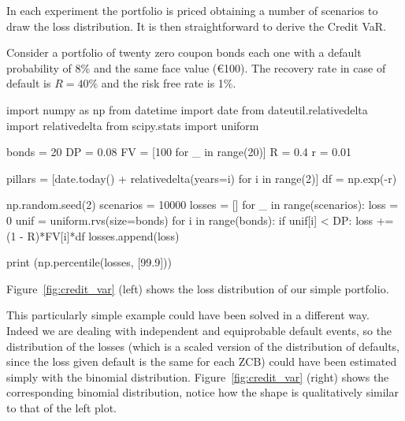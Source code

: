 In each experiment the portfolio is priced obtaining a number of scenarios to draw the loss distribution. It is then straightforward to derive the Credit VaR.

Consider a portfolio of twenty zero coupon bonds each one with a default probability of 8\% and the same face value (\euro{100}). The recovery rate in case of default is $R=40\%$ and the risk free rate is 1\%.

\begin{ipython}
import numpy as np
from datetime import date
from dateutil.relativedelta import relativedelta
from scipy.stats import uniform

bonds = 20
DP = 0.08
FV = [100 for _ in range(20)]
R = 0.4
r = 0.01

pillars = [date.today() + relativedelta(years=i) for i in range(2)]
df = np.exp(-r)

np.random.seed(2)
scenarios = 10000
losses = []
for _ in range(scenarios):
    loss = 0
    unif = uniform.rvs(size=bonds)
    for i in range(bonds):
        if unif[i] < DP:
            loss += (1 - R)*FV[i]*df
    losses.append(loss)

print (np.percentile(losses, [99.9]))
\end{ipython}
\begin{ioutput}
[356.41794015]
\end{ioutput}
\noindent
Figure~\ref{fig:credit_var} (left) shows the loss distribution of our simple portfolio.

This particularly simple example could have been solved in a different way. Indeed we are dealing with independent and equiprobable default events, so the distribution of the losses (which is a scaled version of the distribution of defaults, since the loss given default is the same for each ZCB) could have been estimated simply with the binomial distribution. Figure~\ref{fig:credit_var} (right) shows the corresponding binomial distribution, notice how the shape is qualitatively similar to that of the left plot.

